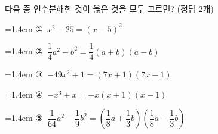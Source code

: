 다음 중 인수분해한 것이 옳은 것을 모두 고르면? (정답 2개)
\par\medskip\par\noindent\hangindent=1.4em {\small ①}\ $x^2-25=(x-5)^2$\par\noindent\hangindent=1.4em {\small ②}\ $\dfrac{1}{4}a^2-b^2=\dfrac{1}{4}(a+b)(a-b)$\par\noindent\hangindent=1.4em {\small ③}\ $-49x^2+1=(7x+1)(7x-1)$\par\noindent\hangindent=1.4em {\small ④}\ $-x^3+x=-x(x+1)(x-1)$\par\noindent\hangindent=1.4em {\small ⑤}\ $\dfrac{1}{64}a^2-\dfrac{1}{9}b^2=\left(\dfrac{1}{8}a+\dfrac{1}{3}b\right)\left(\dfrac{1}{8}a-\dfrac{1}{3}b\right)$\par\medskip
